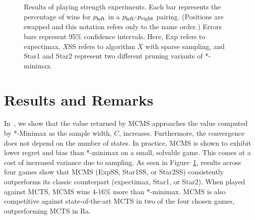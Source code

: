 \documentclass{article}
\newcommand{\mcts}{\textsc{mcts}}
\newcommand{\expecti}{exp}
\newcommand{\expss}{exp\textsc{ss}}
\newcommand{\starone}{Star1}
\newcommand{\startwo}{Star2}
\newcommand{\staroness}{star1\textsc{ss}}
\newcommand{\startwoss}{star2\textsc{ss}}
\begin{document}
\begin{figure}[h]
  \caption{Results of playing strength experiments.
    Each bar represents the percentage of wins for $p_{\text{\footnotesize left}}$ in a 
    $p_{\text{\footnotesize left}}$-$p_{\text{\footnotesize right}}$ pairing. 
    (Positions are swapped and this notation refers only to the name order.)
    Errors bars represent 95\% confidence intervals. 
    Here, %
    Exp refers to expectimax, $X$SS refers to algorithm $X$ with sparse sampling, and Star1 and Star2 represent two 
    different pruning variants of *-minimax.
    \label{fig:perf}}
\end{figure}

\section{Results and Remarks}

In~\cite{Lanctot13MCMS}, we show that the value returned by MCMS approaches the value computed 
by *-Minimax as the sample width, $C$, increases. 
Furthermore, the convergence does not depend on the number of states. 
In practice, MCMS is shown to exhibit lower regret and bias than *-minimax on a small, solvable game. 
This comes at a cost of increased variance due to sampling. 
As seen in Figure~\ref{fig:perf}, results across four games show that MCMS
(ExpSS, Star1SS, or Star2SS) 
consistently outperforms its classic counterpart (expectimax, Star1, or Star2). 
When played against MCTS, MCMS wins 4-16\% more than *-minimax. 
MCMS is also competitive against state-of-the-art MCTS in two of the four chosen games, outperforming 
MCTS in Ra. 



\end{document}
